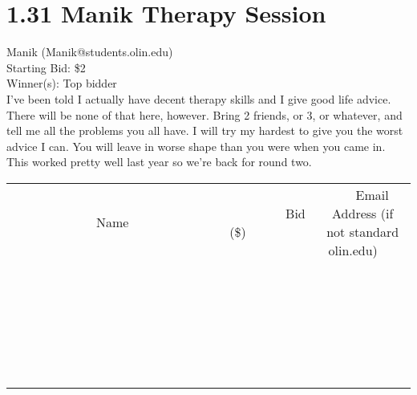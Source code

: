 \documentclass[11pt]{article}
\begin{document}
\section*{1.31 Manik Therapy Session}
Manik (Manik@students.olin.edu) \\
Starting Bid: \$2 \\
Winner(s): 
Top bidder \\
I've been told I actually have decent therapy skills and I give good life advice. There will be none of that here, however. Bring 2 friends, or 3, or whatever, and tell me all the problems you all have. I will try my hardest to give you the worst advice I can. You will leave in worse shape than you were when you came in. This worked pretty well last year so we're back for round two. \\[6ex]
\begin{tabular}{c c c}
~~~~~~~~~~~~~Name~~~~~~~~~~~~~ & ~~~~~~~~~Bid (\$)~~~~~~~~~ & ~~~Email Address (if not standard olin.edu)~~~ \\
 & & \\
\hline
 & & \\
\hline
 & & \\
\hline
 & & \\
\hline
 & & \\
\hline
 & & \\
\hline
 & & \\
\hline
 & & \\
\hline
 & & \\
\hline
 & & \\
\hline
 & & \\
\hline
 & & \\
\hline
 & & \\
\hline
 & & \\
\hline
 & & \\
\hline
 & & \\
\hline
 & & \\
\hline
 & & \\
\hline
 & & \\
\hline
 & & \\
\hline
 & & \\
\hline
 & & \\
\hline
 & & \\
\hline
 & & \\
\hline
 & & \\
\hline
 & & \\
\hline
\end{tabular}
\clearpage
\end{document}
